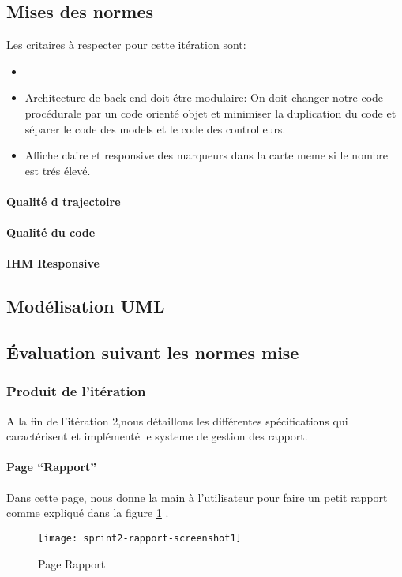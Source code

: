 \subsection{Mises des normes}

Les critaires à respecter pour cette itération sont:

\begin{itemize}
        \item {}
        \item Architecture de back-end doit étre modulaire: On doit changer
            notre code procédurale par un code orienté objet et minimiser la
            duplication du code et séparer le code des models et le code des
            controlleurs.
        \item Affiche claire et responsive des marqueurs dans la carte meme si
            le nombre est trés élevé.
\end{itemize}

\paragraph{Qualité d trajectoire}

\paragraph{Qualité du code}

\paragraph{IHM Responsive}

\subsection{Modélisation UML}

\subsection{Évaluation suivant les normes mise}

\subsubsection{Produit de l'itération}

A la fin de l'itération 2,nous détaillons les différentes spécifications qui caractérisent et 
implémenté le systeme de gestion des rapport.
\paragraph{Page ``Rapport''}
Dans cette page, nous donne la main à l'utilisateur pour faire un petit rapport comme expliqué dans la
figure \ref{fig:sprint2-rapport-screenshot1} . 
\begin{figure}[htbp]
  \centering
  \texttt{[image: sprint2-rapport-screenshot1]}
  \caption{Page Rapport}
  \label{fig:sprint2-rapport-screenshot1}
\end{figure}
